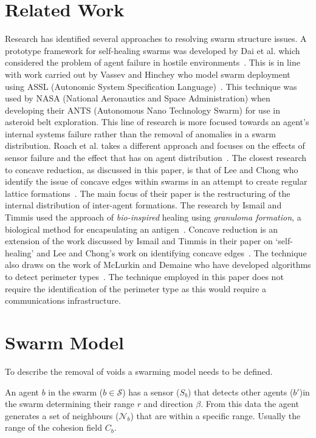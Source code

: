 \documentclass{ieeeaccess}
\begin{document}
\section{Related Work}\label{sec:RelatedWork}
Research has identified several approaches to resolving swarm structure issues. A prototype framework for self-healing swarms was developed by Dai et al. which considered the problem of agent failure in hostile environments~\cite{DHMRZ:06}. This is in line with work carried out by Vassev and Hinchey who model swarm deployment using ASSL (Autonomic System Specification Language)~\cite{VH:09}. This technique was used by NASA (National Aeronautics and Space Administration) when developing their ANTS (Autonomous Nano Technology Swarm) for use in asteroid belt exploration. This line of research is more focused towards an agent's internal systems failure rather than the removal of anomalies in a swarm distribution. Roach et al. takes a different approach and focuses on the effects of sensor failure and the effect that has on agent distribution~\cite{RMT:15}. The closest research to concave reduction, as discussed in this paper, is that of Lee and Chong who identify the issue of concave edges within swarms in an attempt to create regular lattice formations~\cite{GN:08}. The main focus of their paper is the restructuring of the internal distribution of inter-agent formations. The research by Ismail and Timmis used the approach of \textit{bio-inspired} healing using \textit{granuloma formation}, a biological method for encapsulating an antigen~\cite{IT:10}.
Concave reduction is an extension of the work discussed by Ismail and Timmis in their paper on `self-healing' \cite{IT:10} and Lee and Chong's work on identifying concave edges~\cite{GN:08}. The technique also draws on the work of McLurkin and Demaine who have developed algorithms to detect perimeter types~\cite{MD:09}. The technique employed in this paper does not require the identification of the perimeter type as this would require a communications infrastructure.

\section{Swarm Model}\label{sec:Swarm Model}
To describe the removal of voids a swarming model needs to be defined.

An agent $b$ in the swarm ($b\in\mathcal S$) has a sensor ($S_b$) that detects other agents
($b'$)in the swarm
determining their range $r$  and direction $\beta$.  From this data the agent generates a
set of neighbours ($\mathcal N_b$) that are within a specific range.  Usually the range of the
cohesion field $C_b$.
\end{document}
